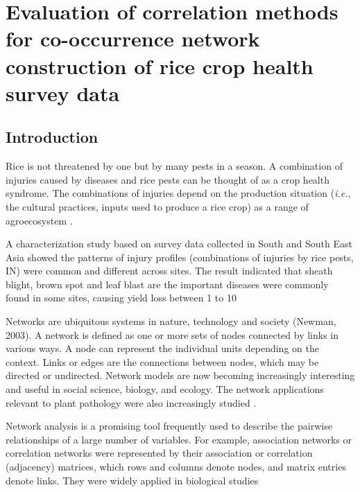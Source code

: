 \section{Evaluation of correlation methods for co-occurrence network construction of rice crop health survey data}

\subsection*{Introduction}

Rice is not threatened by one but by many pests in a season. A combination of injuries caused by diseases and rice pests can be thought of as a crop health syndrome. The combinations of injuries depend on the production situation (\textit{i.e.}, the cultural practices, inputs used to produce a rice crop) as a range of agroecosystem \citep{Savary_2006_Quantification}.

A characterization study based on survey data collected in South and South East Asia \citep{Savary_2000_Characterization} showed the patterns of injury profiles (combinations of injuries by rice pests, IN) were common and different across sites. The result indicated that sheath blight, brown spot and leaf blast are the important diseases were commonly found in some sites, causing yield loss between 1 to 10%

Networks are ubiquitous systems in nature, technology and society (Newman, 2003). A network is defined as one or more sets of nodes connected by links in various ways. A node can represent the individual units depending on the context. Links or edges are the connections between nodes, which may be directed or undirected. Network models are now becoming increasingly interesting and useful in social science, biology, and ecology. The network applications relevant to plant pathology were also increasingly studied \citep{Moslonka_Lefebvre_2011}.

Network analysis is a promising tool frequently used to describe the pairwise relationships of a large number of variables. For example, association networks or correlation networks were represented by their association or correlation (adjacency) matrices, which rows and columns denote nodes, and matrix entries denote links. They were widely applied in biological studies \citep{Toubiana_2013_Net,Barabasi_2004_Network}

